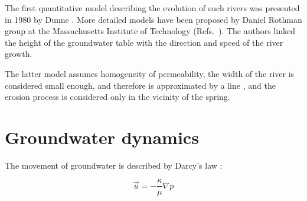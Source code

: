 \documentclass[]{pracamgr}
\begin{document}
    The first quantitative model describing the evolution of such rivers was presented in 1980 by Dunne \cite{dunne1980formation}. More detailed models have been proposed by Daniel Rothman group at the Massachusetts Institute of Technology (Refs.~\cite{petroff2012four, devauchelle2012ramification}). The authors linked the height of the groundwater table with the direction and speed of the river growth.

    The latter model assumes homogeneity of permeability, the width of the river is considered small enough, and therefore is approximated by a line \cite{peterson1998singular,carleson2002laplacian,gubiec2008fingered}, and the erosion process is considered only in the vicinity of the spring.

    \section{Groundwater dynamics}

      The movement of groundwater is described by Darcy's law \cite{darcy1856fontaines}:
      
      \begin{equation}
        \vec{u}=-\frac{\kappa}{\mu} \nabla p
      \end{equation}	
      
\end{document}
